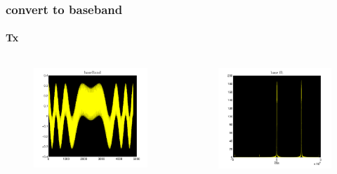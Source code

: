 \documentclass[11pt]{beamer} %
\begin{document}
\begin{frame}
 \frametitle{convert to baseband}
\framesubtitle{Tx}

 \begin{columns}[T]
        \begin{column}{.5\textwidth}
           
      \begin{figure}
\includegraphics[width=1\textwidth]{Figures/SampledTxBase.pdf}
\end{figure}
        \end{column}
         \begin{column}{.5\textwidth}

    \begin{figure}
\includegraphics[width=1\textwidth]{Figures/SampledTxBasefft.pdf}
\end{figure}
        \end{column}
\end{columns}
\end{frame}
\end{document}
